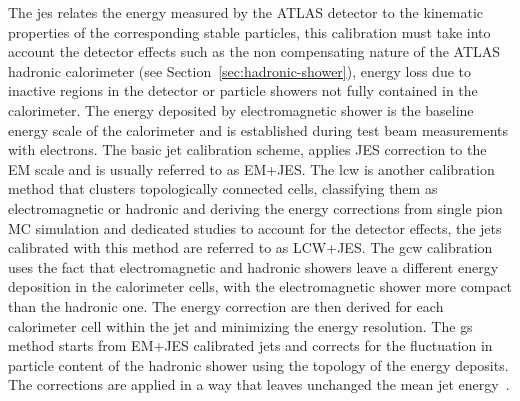 The \gls{jes} relates the energy measured by the ATLAS detector to the kinematic
properties of the corresponding stable particles, this calibration must take
into account the detector effects such as the non compensating nature of the
ATLAS hadronic calorimeter (see Section~\ref{sec:hadronic-shower}), energy loss
due to inactive regions in the detector or particle showers not fully contained
in the calorimeter. The energy deposited by electromagnetic shower is the
baseline energy scale of the calorimeter and is established during test beam
measurements with electrons. The basic jet calibration scheme, applies JES
correction to the EM scale and is usually referred to as EM+JES. The \gls{lcw}
is another calibration method that clusters topologically connected cells,
classifying them as electromagnetic or hadronic and deriving the energy
corrections from single pion MC simulation and dedicated studies to account for
the detector effects, the jets calibrated with this method are referred to as
LCW+JES\@. The \gls{gcw} calibration uses the fact that electromagnetic and
hadronic showers leave a different energy deposition in the calorimeter cells,
with the electromagnetic shower more compact than the hadronic one. The energy
correction are then derived for each calorimeter cell within the jet and
minimizing the energy resolution. The \gls{gs} method starts from EM+JES
calibrated jets and corrects for the fluctuation in particle content of the
hadronic shower using the topology of the energy deposits. The corrections are
applied in a way that leaves unchanged the mean jet energy~\cite{JetCalib}.
